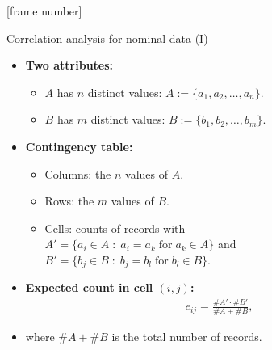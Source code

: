 \documentclass[aspectratio=169,t]{beamer}
\begin{document}
  {
    [frame number]
    \begin{frame}{Correlation analysis for nominal data (I)}
      \begin{itemize}
        \item \textbf{Two attributes:}
        \begin{itemize}
          \item $A$ has $n$ distinct values: $A := \{a_1, a_2, \ldots, a_n\}$.
          \item $B$ has $m$ distinct values: $B := \{b_1, b_2, \ldots, b_m\}$.
        \end{itemize}
        \item \textbf{\color{airforceblue}Contingency table:}
        \begin{itemize}
          \item Columns: the $n$ values of $A$.
          \item Rows: the $m$ values of $B$.
          \item Cells: counts of records with \\
          $A' = \{ a_i \in A \; : \; a_i = a_k \; \text{for} \; a_k \in A\}$ and \\
          $B' = \{ b_j \in B \; : \; b_j = b_l \; \text{for} \; b_l \in B\}$.
        \end{itemize}
        \item \textbf{Expected count in cell $(i,j)$:}
        \begin{align}
          e_{ij} = \frac{\#A' \cdot \#B'}{\#A + \#B},
        \end{align}
        \item where $\#A + \#B$ is the total number of records.
      \end{itemize}
    \end{frame}
  }
\end{document}
